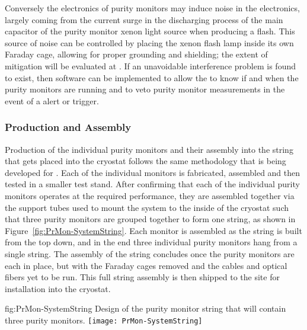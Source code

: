 Conversely the electronics of purity monitors may induce noise in the  electronics, largely coming from the current surge in the discharging process of the main capacitor of the purity monitor xenon light source when producing a flash.  This source of noise can be controlled by placing the xenon flash lamp inside its own Faraday cage, allowing for proper grounding and shielding; the extent of mitigation will be evaluated at .
If an unavoidable interference problem is found to exist, then software can be implemented to allow the  to know if and when the purity monitors are running and to veto purity monitor measurements in the event of a  alert or trigger. 


\subsubsection{Production and Assembly}
\label{sec:PrMon-Production-Assembly}
Production of the individual purity monitors and their assembly into the string that gets placed into the  cryostat follows the same methodology that is being developed for .  Each of the individual monitors is fabricated, assembled and then tested in a smaller test stand.  After confirming that each of the individual purity monitors operates at the required performance, they are assembled together via the support tubes used to mount the system to the inside of the cryostat such that three purity monitors are grouped together to form one string, as shown in Figure~\ref{fig:PrMon-SystemString}.
Each monitor is assembled as the string is built from the top down, and in the end %
three individual purity monitors %
hang from a single string.  The assembly of the string concludes once the purity monitors are each in place, but with the Faraday cages removed and the  cables and optical fibers yet to be run.  This full string assembly is then %
shipped to the  site for installation into the cryostat.

\begin{dunefigure}{fig:PrMon-SystemString}
  {Design of the purity monitor string that will contain three purity monitors.}
  \texttt{[image: PrMon-SystemString]}
\end{dunefigure}




